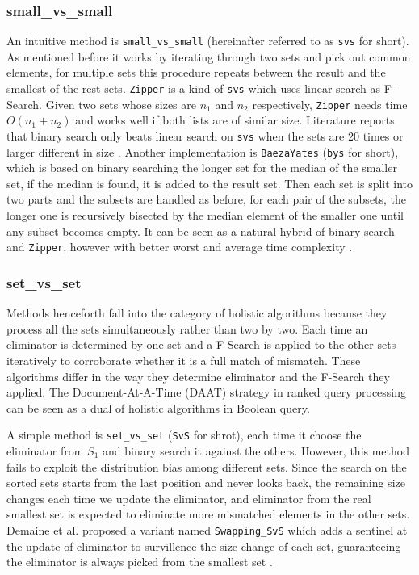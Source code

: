 \documentclass[runningheads,a4paper]{llncs}
\begin{document}
\subsubsection{small\_vs\_small}
An intuitive method is \texttt{small\_vs\_small} (hereinafter referred to as \texttt{svs} for short).
As mentioned before it works by iterating through two sets and pick out common elements, for multiple sets this procedure repeats between the result and the smallest of the rest sets.
\texttt{Zipper} is a kind of \texttt{svs} which uses linear search as F-Search.
Given two sets whose sizes are $ n_1 $ and $ n_2 $ respectively, \texttt{Zipper} needs time $ O( n_1 + n_2 ) $ and works well if both lists are of similar size.
Literature reports that binary search only beats linear search on \texttt{svs} when the sets are 20 times or larger different in size \cite{navarro2010dual,Sanders2007Intersection}.
Another implementation is \texttt{BaezaYates} (\texttt{bys} for short), which is based on binary searching the longer set for the median of the smaller set, if the median is found, it is added to the result set.
Then each set is split into two parts and the subsets are handled as before, for each pair of the subsets, the longer one is recursively bisected by the median element of the smaller one until any subset becomes empty.
It can be seen as a natural hybrid of binary search and \texttt{Zipper}, however with better worst and average time complexity \cite{Baeza2010Fast}.
\subsubsection{set\_vs\_set}
Methods henceforth fall into the category of holistic algorithms because they process all the sets simultaneously rather than two by two.
Each time an eliminator is determined by one set and a F-Search is applied to the other sets iteratively to corroborate whether it is a full match of mismatch.
These algorithms differ in the way they determine eliminator and the F-Search they applied.
The Document-At-A-Time (DAAT) strategy in ranked query processing can be seen as a dual of holistic algorithms in Boolean query.

A simple method is \texttt{set\_vs\_set} (\texttt{SvS} for shrot), each time it choose the eliminator from $ S_1 $ and binary search it against the others.
However, this method fails to exploit the distribution bias among different sets.
Since the search on the sorted sets starts from the last position and never looks back, the remaining size changes each time we update the eliminator, and eliminator from the real smallest set is expected to eliminate more mismatched elements in the other sets.
Demaine et al. proposed a variant named \texttt{Swapping\_SvS} which adds a sentinel at the update of eliminator to survillence the size change of each set, guaranteeing the eliminator is always picked from the smallest set \cite{Demaine2001Experiments}.
\end{document}
